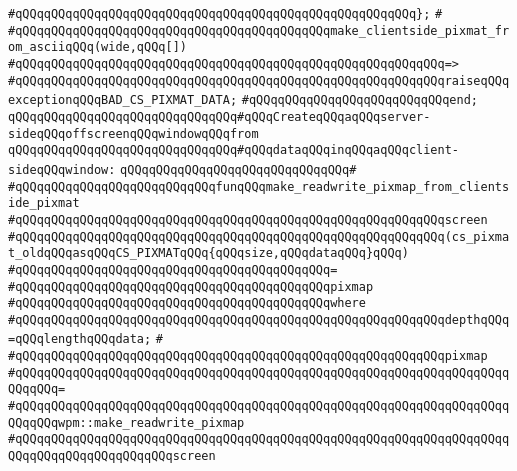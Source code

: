 \verb|#qQQqqQQqqQQqqQQqqQQqqQQqqQQqqQQqqQQqqQQqqQQqqQQqqQQqqQQq};|\newline
\verb|#|\newline
\verb|#qQQqqQQqqQQqqQQqqQQqqQQqqQQqqQQqqQQqqQQqqQQqmake_clientside_pixmat_from_asciiqQQq(wide,qQQq[])|\newline
\verb|#qQQqqQQqqQQqqQQqqQQqqQQqqQQqqQQqqQQqqQQqqQQqqQQqqQQqqQQqqQQq=>|\newline
\verb|#qQQqqQQqqQQqqQQqqQQqqQQqqQQqqQQqqQQqqQQqqQQqqQQqqQQqqQQqqQQqraiseqQQqexceptionqQQqBAD_CS_PIXMAT_DATA;|\newline
\verb|#qQQqqQQqqQQqqQQqqQQqqQQqqQQqend;|\newline
\newline
\newline
\newline
\verb|qQQqqQQqqQQqqQQqqQQqqQQqqQQqqQQq#qQQqCreateqQQqaqQQqserver-sideqQQqoffscreenqQQqwindowqQQqfrom|\newline
\verb|qQQqqQQqqQQqqQQqqQQqqQQqqQQqqQQq#qQQqdataqQQqinqQQqaqQQqclient-sideqQQqwindow:|\newline
\verb|qQQqqQQqqQQqqQQqqQQqqQQqqQQqqQQq#|\newline
\verb|#qQQqqQQqqQQqqQQqqQQqqQQqqQQqfunqQQqmake_readwrite_pixmap_from_clientside_pixmat|\newline
\verb|#qQQqqQQqqQQqqQQqqQQqqQQqqQQqqQQqqQQqqQQqqQQqqQQqqQQqqQQqqQQqscreen|\newline
\verb|#qQQqqQQqqQQqqQQqqQQqqQQqqQQqqQQqqQQqqQQqqQQqqQQqqQQqqQQqqQQq(cs_pixmat_oldqQQqasqQQqCS_PIXMATqQQq{qQQqsize,qQQqdataqQQq}qQQq)|\newline
\verb|#qQQqqQQqqQQqqQQqqQQqqQQqqQQqqQQqqQQqqQQqqQQq=|\newline
\verb|#qQQqqQQqqQQqqQQqqQQqqQQqqQQqqQQqqQQqqQQqqQQqpixmap|\newline
\verb|#qQQqqQQqqQQqqQQqqQQqqQQqqQQqqQQqqQQqqQQqqQQqwhere|\newline
\verb|#qQQqqQQqqQQqqQQqqQQqqQQqqQQqqQQqqQQqqQQqqQQqqQQqqQQqqQQqqQQqdepthqQQq=qQQqlengthqQQqdata;|\newline
\verb|#|\newline
\verb|#qQQqqQQqqQQqqQQqqQQqqQQqqQQqqQQqqQQqqQQqqQQqqQQqqQQqqQQqqQQqpixmap|\newline
\verb|#qQQqqQQqqQQqqQQqqQQqqQQqqQQqqQQqqQQqqQQqqQQqqQQqqQQqqQQqqQQqqQQqqQQqqQQqqQQq=|\newline
\verb|#qQQqqQQqqQQqqQQqqQQqqQQqqQQqqQQqqQQqqQQqqQQqqQQqqQQqqQQqqQQqqQQqqQQqqQQqqQQqwpm::make_readwrite_pixmap|\newline
\verb|#qQQqqQQqqQQqqQQqqQQqqQQqqQQqqQQqqQQqqQQqqQQqqQQqqQQqqQQqqQQqqQQqqQQqqQQqqQQqqQQqqQQqqQQqqQQqscreen|\newline
